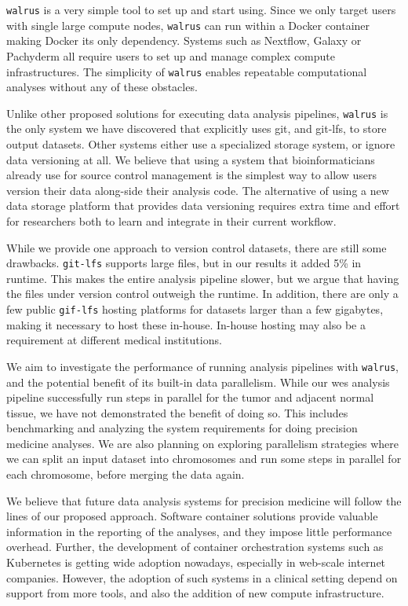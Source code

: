 \texttt{walrus} is a very simple tool to set up and start using. Since we only
target users with single large compute nodes, \texttt{walrus} can run within a
Docker container making Docker its only dependency. Systems such as Nextflow,
Galaxy or Pachyderm all require users to set up and manage complex compute
infrastructures. The simplicity of \texttt{walrus} enables repeatable
computational analyses without any of these obstacles. 

Unlike other proposed solutions for executing data analysis pipelines,
\texttt{walrus} is the only system we have discovered that explicitly uses git,
and git-lfs, to store output datasets. Other systems either use a specialized
storage system, or ignore data versioning at all. We believe that using a system
that bioinformaticians already use for source control management is the simplest
way to allow users version their data along-side their analysis code. The
alternative of using a new data storage platform that provides data versioning
requires extra time and effort for researchers both to learn and integrate in
their current workflow. 

While we provide one approach to version control datasets, there are still some
drawbacks. \texttt{git-lfs} supports large files, but in our results it added
5\% in runtime.  This makes the entire analysis pipeline slower, but we argue
that having the files under version control outweigh the runtime. In addition,
there are only a few public \texttt{gif-lfs} hosting platforms for datasets
larger than a few gigabytes, making it necessary to host these in-house.
In-house hosting may also be a requirement at different medical institutions.  

We aim to investigate the performance of running analysis pipelines with
\texttt{walrus}, and the potential benefit of its built-in data parallelism.
While our \gls{wes} analysis pipeline successfully run steps in parallel for the
tumor and adjacent normal tissue, we have not demonstrated the benefit
of doing so. This includes benchmarking and analyzing the system requirements
for doing precision medicine analyses.  We are also planning on exploring
parallelism strategies where we can split an input dataset into chromosomes and
run some steps in parallel for each chromosome, before merging the data again. 

We believe that future data analysis systems for precision medicine will follow
the lines of our proposed approach. Software container solutions provide
valuable information in the reporting of the analyses, and they impose little
performance overhead. Further, the development of container orchestration
systems such as Kubernetes is getting wide adoption nowadays, especially in
web-scale internet companies. However, the adoption of such systems in a
clinical setting depend on support from more tools, and also the addition
of new compute infrastructure. 

